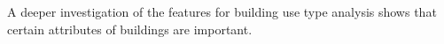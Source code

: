 A deeper investigation of the features for building use type analysis shows that certain attributes of buildings are important.